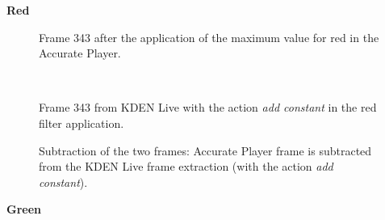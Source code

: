 \documentclass[../MasterThesis.tex]{subfiles}
\begin{document}
\textbf{Red}

\vspace*{-1em}

\begin{minipage}{0.48\textwidth}
	\begin{figure}[H]
		\begin{center}
			\caption[Frame 343 after the application of the red filter in the Accurate Player.]{Frame 343 after the application of the maximum value for red in the Accurate Player.}
		\end{center}
	\end{figure}
\end{minipage}\begin{minipage}{0.04\textwidth}
	\ 
\end{minipage}\begin{minipage}{0.48\textwidth}
	\begin{figure}[H]
		\begin{center}
			\caption[Frame 343 from KDEN Live with the action \textit{add constant}.]{Frame 343 from KDEN Live with the action \textit{add constant} in the red filter application.}
		\end{center}
	\end{figure}
\end{minipage}

\vspace*{-1em}

\begin{figure}[H]
	\begin{center}
		\caption[Subtraction of KDEN Live (\textit{add constant}) and Accurate Player.]{Subtraction of the two frames: Accurate Player frame is subtracted from the KDEN Live frame extraction (with the action \textit{add constant}).}
	\end{center}
\end{figure}





\vspace*{-1em}
\textbf{Green}

\vspace*{-1em}
\end{document}
